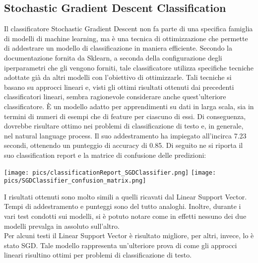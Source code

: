 \documentclass[12pt,oneside]{article}
\begin{document}
   \begin{enumerate}
    \subsection{Stochastic Gradient Descent Classification}
    \begin{justify}
    Il classificatore Stochastic Gradient Descent non fa parte di una specifica famiglia di modelli di machine learning, ma è una tecnica di ottimizzazione che permette di addestrare un modello di classificazione in maniera efficiente. Secondo la documentazione fornita da Sklearn, a seconda della configurazione degli iperparametri che gli vengono forniti, tale classificatore utilizza specifiche tecniche adottate già da altri modelli con l’obiettivo di ottimizzarle. Tali tecniche si basano su approcci lineari e, visti gli ottimi risultati ottenuti dai precedenti classificatori lineari, sembra ragionevole considerare anche quest’ulteriore classificatore. È un modello adatto per apprendimenti su dati in larga scala, sia in termini di numeri di esempi che di feature per ciascuno di essi. Di conseguenza, dovrebbe risultare ottimo nei problemi di classificazione di testo e, in generale, nel natural language process.
    Il suo addestramento ha impiegato all’incirca 7.23 secondi, ottenendo un punteggio di accuracy di 0.85. Di seguito ne si riporta il suo classification report e la matrice di confusione delle predizioni:
    \end{justify}

    \centering
    \texttt{[image: pics/classificationReport\_SGDClassifier.png]}
    \texttt{[image: pics/SGDClassifier\_confusion\_matrix.png]}

    \begin{justify}
    I risultati ottenuti sono molto simili a quelli ricavati dal Linear Support Vector. Tempi di addestramento e punteggi sono del tutto analoghi. Inoltre, durante i vari test condotti sui modelli, si è potuto notare come in effetti nessuno dei due modelli prevalga in assoluto sull’altro.\\
    Per alcuni testi il Linear Support Vector è risultato migliore, per altri, invece, lo è stato SGD. Tale modello rappresenta un’ulteriore prova di come gli approcci lineari risultino ottimi per problemi di classificazione di testo.
    \end{justify}
    \end{enumerate}
\end{document}
